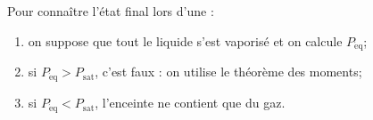 \begin{methode}
Pour connaître l'état final lors d'une  :

\begin{enumerate}[label=\protect\circled{\tdef{\arabic*}}]
\item on suppose que tout le liquide s'est vaporisé et on calcule $P_{\mathrm{\acute eq}}$;
\item si $P_{\mathrm{\acute eq}} > P_{\mathrm{sat}}$, c'est faux : on utilise le théorème des moments;
\item si $P_{\mathrm{\acute eq}} < P_{\mathrm{sat}}$, l'enceinte ne contient que du gaz.
\end{enumerate}
\end{methode}